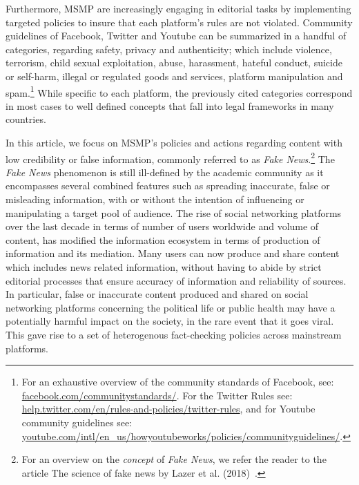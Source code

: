 \documentclass[11pt,a4paper]{article}
\begin{document}
\smallskip

Furthermore, MSMP are increasingly engaging in editorial tasks by implementing targeted policies to insure that each platform's rules are not violated. Community guidelines of Facebook, Twitter and Youtube can be summarized in a handful of categories, regarding safety, privacy and authenticity; which include violence, terrorism, child sexual exploitation, abuse, harassment, hateful conduct, suicide or self-harm, illegal or regulated goods and services, platform manipulation and spam.\footnote{For an exhaustive overview of the community standards of Facebook, see: \href{https://www.facebook.com/communitystandards/}{facebook.com/communitystandards/}. For the Twitter  Rules see: \href{https://help.twitter.com/en/rules-and-policies/twitter-rules}{help.twitter.com/en/rules-and-policies/twitter-rules}, and for Youtube community guidelines see: \href{https://www.youtube.com/intl/en\_us/howyoutubeworks/policies/community\-guidelines/}{youtube.com/intl/en\_us/howyoutubeworks/policies/community\-guidelines/}.} While specific to each platform, the previously cited categories correspond in most cases to well defined concepts that fall into legal frameworks in many countries. 

\smallskip

In this article, we focus on MSMP's policies and actions regarding content with low credibility or false information, commonly referred to as {\it Fake News}.\footnote{For an overview on the {\it concept} of {\it Fake News}, we refer the reader to the article The science of fake news by Lazer et al. (2018)~\cite{lazer}.} The {\it Fake News} phenomenon is still ill-defined by the academic community as it encompasses several combined features such as spreading inaccurate, false or misleading information, with or without the intention of influencing or manipulating a target pool of audience. The rise of social networking platforms over the last decade in terms of number of users worldwide and volume of content, has modified the information ecosystem in terms of production of information and its mediation. Many users can now produce and share content which includes news related information, without having to abide by strict editorial processes that ensure accuracy of information and reliability of sources. In particular, false or inaccurate content produced and shared on social networking platforms concerning the political life or public health may have a potentially harmful impact on the society, in the rare event that it goes viral. This gave rise to a set of heterogenous fact-checking policies across mainstream platforms.
 
\end{document}
